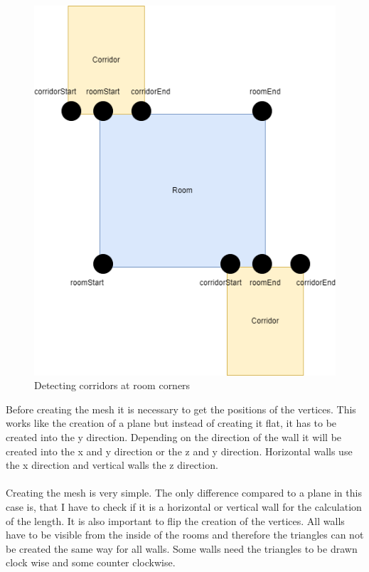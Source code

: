 \documentclass[a4paper,11pt,oneside]{scrreprt}
\begin{document}
\begin{figure}[htb]
	\centering
	\includegraphics[scale=0.5]{images/detecting_corridors2.drawio.png}    
	\caption{Detecting corridors at room corners}
	\label{fig:detecting-corridors-at-room-corners}
\end{figure}

Before creating the mesh it is necessary to get the positions of the vertices. This works like the creation of a plane but instead of creating it flat, it has to be created into the y direction. Depending on the direction of the wall it will be created into the x and y direction or the z and y direction. Horizontal walls use the x direction and vertical walls the z direction. 
\\
\\
Creating the mesh is very simple. The only difference compared to a plane in this case is, that I have to check if it is a horizontal or vertical wall for the calculation of the length. It is also important to flip the creation of the vertices. 
All walls have to be visible from the inside of the rooms and therefore the triangles can not be created the same way for all walls. Some walls need the triangles to be drawn clock wise and some counter clockwise.
\end{document}
